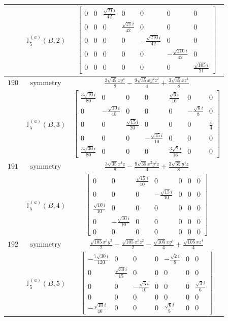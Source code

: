\documentclass[fleqn,8pt,landscape]{jsarticle}
\begin{document}
\begin{longtable}{ccc}
$  $ & $ \mathbb{T}_{5}^{(a)}(B,2) $ & $ \begin{bmatrix} 0 & 0 & \frac{\sqrt{21} i}{42} & 0 & 0 & 0 & 0 \\ 0 & 0 & 0 & \frac{\sqrt{21} i}{42} & 0 & 0 & 0 \\ 0 & 0 & 0 & 0 & - \frac{\sqrt{210} i}{42} & 0 & 0 \\ 0 & 0 & 0 & 0 & 0 & - \frac{\sqrt{210} i}{42} & 0 \\ 0 & 0 & 0 & 0 & 0 & 0 & \frac{\sqrt{105} i}{21} \end{bmatrix} $ \\ \hline
$ 190 $ & $ \text{symmetry} $ & $ \frac{3 \sqrt{35} x y^{4}}{8} - \frac{9 \sqrt{35} x y^{2} z^{2}}{4} + \frac{3 \sqrt{35} x z^{4}}{8} $ \\
$  $ & $ \mathbb{T}_{5}^{(a)}(B,3) $ & $ \begin{bmatrix} \frac{3 \sqrt{10} i}{80} & 0 & 0 & 0 & \frac{\sqrt{6} i}{16} & 0 & 0 \\ 0 & - \frac{\sqrt{10} i}{40} & 0 & 0 & 0 & - \frac{\sqrt{6} i}{8} & 0 \\ 0 & 0 & \frac{\sqrt{15} i}{20} & 0 & 0 & 0 & \frac{i}{4} \\ 0 & 0 & 0 & - \frac{\sqrt{15} i}{10} & 0 & 0 & 0 \\ \frac{3 \sqrt{30} i}{80} & 0 & 0 & 0 & \frac{3 \sqrt{2} i}{16} & 0 & 0 \end{bmatrix} $ \\ \hline
$ 191 $ & $ \text{symmetry} $ & $ \frac{3 \sqrt{35} x^{4} z}{8} - \frac{9 \sqrt{35} x^{2} y^{2} z}{4} + \frac{3 \sqrt{35} y^{4} z}{8} $ \\
$  $ & $ \mathbb{T}_{5}^{(a)}(B,4) $ & $ \begin{bmatrix} 0 & 0 & \frac{\sqrt{15} i}{10} & 0 & 0 & 0 & 0 \\ 0 & 0 & 0 & - \frac{\sqrt{15} i}{10} & 0 & 0 & 0 \\ \frac{\sqrt{10} i}{10} & 0 & 0 & 0 & 0 & 0 & 0 \\ 0 & - \frac{\sqrt{10} i}{10} & 0 & 0 & 0 & 0 & 0 \\ 0 & 0 & 0 & 0 & 0 & 0 & 0 \end{bmatrix} $ \\ \hline
$ 192 $ & $ \text{symmetry} $ & $ \frac{\sqrt{105} x^{3} y^{2}}{2} - \frac{\sqrt{105} x^{3} z^{2}}{2} - \frac{\sqrt{105} x y^{4}}{4} + \frac{\sqrt{105} x z^{4}}{4} $ \\
$  $ & $ \mathbb{T}_{5}^{(a)}(B,5) $ & $ \begin{bmatrix} - \frac{7 \sqrt{30} i}{120} & 0 & 0 & 0 & - \frac{\sqrt{2} i}{8} & 0 & 0 \\ 0 & \frac{\sqrt{30} i}{15} & 0 & 0 & 0 & 0 & 0 \\ 0 & 0 & - \frac{\sqrt{5} i}{10} & 0 & 0 & 0 & \frac{\sqrt{3} i}{6} \\ 0 & 0 & 0 & 0 & 0 & 0 & 0 \\ - \frac{\sqrt{10} i}{40} & 0 & 0 & 0 & \frac{\sqrt{6} i}{8} & 0 & 0 \end{bmatrix} $ \\ \hline

\end{longtable}
\end{document}

